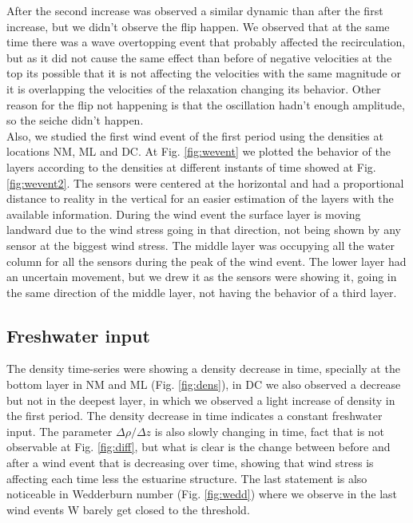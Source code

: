 \documentclass[tesis.tex]{subfiles}
\begin{document}
After the second increase was observed a similar dynamic than after the first increase, but we didn't observe the flip happen. We observed that at the same time there was a wave overtopping event that probably affected the recirculation, but as it did not cause the same effect than before of negative velocities at the top its possible that it is not affecting the velocities with the same magnitude or it is overlapping the velocities of the relaxation changing its behavior. Other reason for the flip not happening is that the oscillation hadn't enough amplitude, so the seiche didn't happen.\\

Also, we studied the first wind event of the first period using the densities at locations NM, ML and DC. At Fig. \ref{fig:wevent} we plotted the behavior of the layers according to the densities at different instants of time showed at Fig. \ref{fig:wevent2}. The sensors were centered at the horizontal and had a proportional distance to reality in the vertical for an easier estimation of the layers with the available information. During the wind event the surface layer is moving landward due to the wind stress going in that direction, not being shown by any sensor at the biggest wind stress. The middle layer was occupying all the water column for all the sensors during the peak of the wind event. The lower layer had an uncertain movement, but we drew it as the sensors were showing it, going in the same direction of the middle layer, not having the behavior of a third layer.\\

\subsection{Freshwater input}

The density time-series were showing a density decrease in time, specially at the bottom layer in NM and ML (Fig. \ref{fig:dens}), in DC we also observed a decrease but not in the deepest layer, in which we observed a light increase of density in the first period. The density decrease in time indicates a constant freshwater input. The parameter $\Delta \rho / \Delta z$ is also slowly changing in time, fact that is not observable at Fig. \ref{fig:diff}, but what is clear is the change between before and after a wind event that is decreasing over time, showing that wind stress is affecting each time less the estuarine structure. The last statement is also noticeable in Wedderburn number (Fig. \ref{fig:wedd}) where we observe in the last wind events W barely get closed to the threshold.\\
\end{document}
